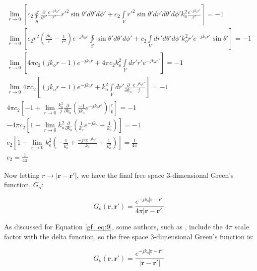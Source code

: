 \begin{equation}
\begin{gathered}
\lim_{r\to0}\left[c_2\oint\limits_{S}\frac{\partial }{\partial r'}\frac{e^{-jk_or'}}{r'} r'^2\sin{\theta'} d\theta' d\phi '+ c_2\int\limits_{V}r'^2 \sin{\theta'}dr' d\theta' d\phi' k_o^2\frac{e^{-jk_or'}}{r'}\right] = -1 \\
\lim_{r\to0}\left[c_2 r^2\left( \frac{jk_o}{r} - \frac{1}{r^2}\right)e^{-jk_or}\oint\limits_{S}\sin{\theta'} d\theta' d\phi' + c_2\int\limits_{V}dr' d\theta' d\phi' k_o^2r'e^{-jk_or'}\sin{\theta'}\right] = -1 \\
\lim_{r\to0}\left[4\pi c_2 \left( jk_or - 1\right)e^{-jk_or}+ 4\pi c_2k_o^2\int\limits_{V}dr' r'e^{-jk_or'}\right] = -1 \\
\lim_{r\to0}4\pi c_2\left[\left( jk_or - 1\right)e^{-jk_or}+ k_o^2\int\limits_{V}dr' \frac{\partial}{\partial k_o}\frac{e^{-jk_or'}}{j}\right] = -1 \\
4\pi c_2\left[-1 +  \lim_{r\to0}\frac{k_o^2}{j}\frac{\partial}{\partial k_o}\left( \frac{-1}{jk_o}e^{-jk_or'}\right)\bigg|_0^{r}  \right] = -1 \\
-4\pi c_2\left[1 - \lim_{r\to0}k_o^2\frac{\partial}{\partial k_o}\left( \frac{1}{k_o}e^{-jk_o} - \frac{1}{k_o}\right) \right] = -1 \\
c_2\left[1 - \lim_{r\to0}k_o^2\left(-\frac{1}{k_o^2}+\frac{-jre^{-jk_or}}{k_o}+\frac{1}{k_o^2}\right) \right] = \frac{1}{4\pi} \\
 c_2 = \frac{1}{4\pi}
\end{gathered}
\label{gf_eq:25}
\end{equation}
\renewcommand{\baselinestretch}{2} \small\normalsize

\noindent Now letting $r \rightarrow |\mathbf{r}-\mathbf{r}'|$, we have the final free space 3-dimensional Green's function, $G_o$:

\begin{equation}
\boxed{G_o\left(\mathbf{r},\mathbf{r}'\right) = \frac{e^{-jk_o|\mathbf{r} - \mathbf{r}'|}}{4\pi |\mathbf{r} - \mathbf{r}'|}}
\label{gf_eq:26}
\end{equation}
\renewcommand{\baselinestretch}{2} \small\normalsize

As discussed for Equation \ref{gf_eq:9}, some authors, such as \cite{jackson_classical_em}, include the $4\pi$ scale factor with the delta function, so the free space 3-dimensional Green's function is:

\begin{equation}
G_o\left(\mathbf{r},\mathbf{r}'\right)  = \frac{e^{-jk_o|\mathbf{r} - \mathbf{r}'|}}{|\mathbf{r} - \mathbf{r}'|}
\label{gf_eq:27}
\end{equation}
\renewcommand{\baselinestretch}{2} \small\normalsize

